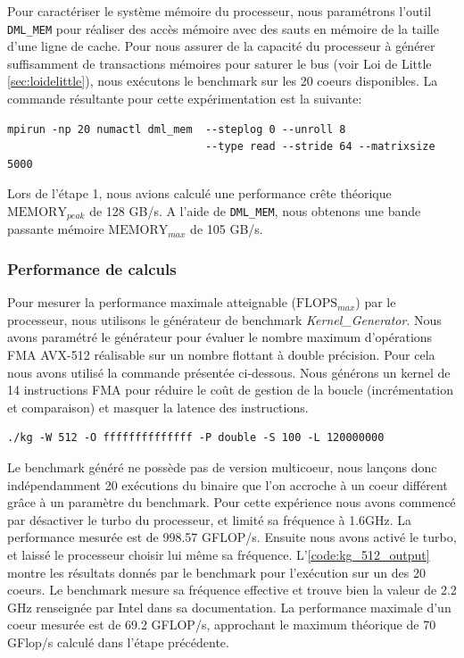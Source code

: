         Pour caractériser le système mémoire du processeur, nous paramétrons l'outil \verb=DML_MEM= pour réaliser des accès mémoire avec des sauts en mémoire de la taille d'une ligne de cache.
        Pour nous assurer de la capacité du processeur à générer suffisamment de transactions mémoires pour saturer le bus (voir Loi de Little \autoref{sec:loidelittle}), nous exécutons le benchmark sur les 20 coeurs disponibles. La commande résultante pour cette expérimentation est la suivante:
\begin{lstlisting}
mpirun -np 20 numactl dml_mem  --steplog 0 --unroll 8 
                               --type read --stride 64 --matrixsize 5000
\end{lstlisting}
        Lors de l'étape 1, nous avions calculé une performance crête théorique $\text{MEMORY}_{peak}$ de 128 GB/s. A l'aide de \verb=DML_MEM=, nous obtenons une bande passante mémoire $\text{MEMORY}_{max}$ de 105 GB/s.
        
    
    
    \subsubsection{Performance de calculs}
    
        Pour mesurer la performance maximale atteignable ($\text{FLOPS}_{max}$) par le processeur, nous utilisons le générateur de benchmark \textit{Kernel\_Generator}. Nous avons paramétré le générateur pour évaluer le nombre maximum d'opérations FMA AVX-512 réalisable sur un nombre flottant à double précision. Pour cela nous avons utilisé la commande présentée ci-dessous. Nous générons un kernel de 14 instructions FMA pour réduire le coût de gestion de la boucle (incrémentation et comparaison) et masquer la latence des instructions.

\begin{lstlisting}
./kg -W 512 -O ffffffffffffff -P double -S 100 -L 120000000
\end{lstlisting}
        
        Le benchmark généré ne possède pas de version multicoeur, nous lançons donc indépendamment 20 exécutions du binaire que l'on accroche à un coeur différent grâce à un paramètre du benchmark. Pour cette expérience nous avons commencé par désactiver le turbo du processeur, et limité sa fréquence à 1.6GHz. La performance mesurée est de 998.57 GFLOP/s. Ensuite nous avons activé le turbo, et laissé le processeur choisir lui même sa fréquence. L'\autoref{code:kg_512_output} montre les résultats donnés par le benchmark pour l'exécution sur un des 20 coeurs. Le benchmark mesure sa fréquence effective et trouve bien la valeur de 2.2 GHz renseignée par Intel dans sa documentation. La performance maximale d'un coeur mesurée  est de 69.2 GFLOP/s, approchant le maximum théorique de 70 GFlop/s calculé dans l'étape précédente.
        

